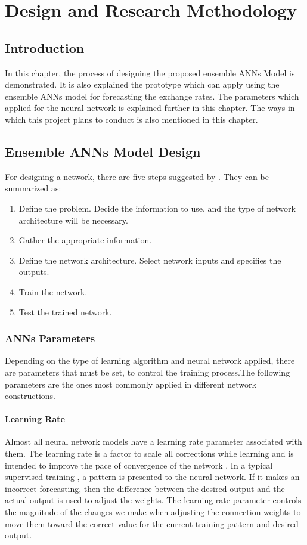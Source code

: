 \chapter{ Design and Research Methodology }
\section{Introduction}
In this chapter, the process of designing the proposed ensemble ANNs Model is demonstrated. It is also explained the prototype which can apply using the ensemble ANNs model for forecasting the exchange rates. The parameters  which applied for the neural network is explained further in this chapter. The ways in which this project plans to conduct is also mentioned in this chapter. 

\section{Ensemble ANNs Model Design}
For designing a network, there are five steps suggested by . They can be summarized as:
\begin{enumerate}
	\item Define the problem. Decide the information to use, and the type of network architecture will be necessary.
	\item Gather the appropriate information.
	\item Define the network architecture. Select network inputs and specifies the outputs.
	\item Train the network.
	\item Test the trained network.
\end{enumerate}

\subsection{ANNs Parameters}
Depending on the type of learning algorithm and neural network applied, there are parameters that must be set,  to control the training process.The following parameters are the ones most commonly applied in different network constructions.
\subsubsection{Learning Rate}
Almost all neural network models have a learning rate parameter associated with them. The learning rate is a factor to scale all corrections while learning and is intended to improve the pace of convergence of the network \cite{lawrence:1993}.
In a typical supervised training , a pattern is presented to the neural network. If it makes an incorrect forecasting, then the difference between the desired output and the actual output is used to adjust the weights. The learning rate parameter controls the magnitude of the changes we make when adjusting the connection weights to move them toward the correct value for the current training pattern and desired output.

